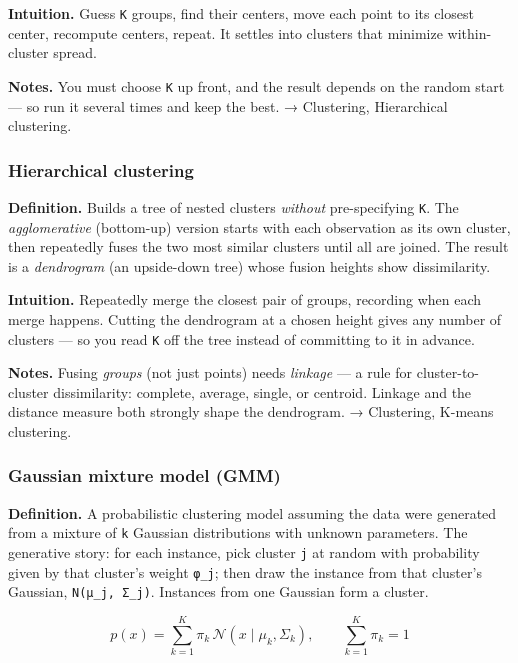 \documentclass[
  10pt,
  letterpaper,
  onecolumn]{article}
\begin{document}
\textbf{Intuition.} Guess \texttt{K} groups, find their centers, move
each point to its closest center, recompute centers, repeat. It settles
into clusters that minimize within-cluster spread.

\textbf{Notes.} You must choose \texttt{K} up front, and the result
depends on the random start --- so run it several times and keep the
best. → Clustering, Hierarchical clustering.

\hypertarget{hierarchical-clustering}{%
\subsubsection{Hierarchical clustering}\label{hierarchical-clustering}}

\textbf{Definition.} Builds a tree of nested clusters \emph{without}
pre-specifying \texttt{K}. The \emph{agglomerative} (bottom-up) version
starts with each observation as its own cluster, then repeatedly fuses
the two most similar clusters until all are joined. The result is a
\emph{dendrogram} (an upside-down tree) whose fusion heights show
dissimilarity.

\textbf{Intuition.} Repeatedly merge the closest pair of groups,
recording when each merge happens. Cutting the dendrogram at a chosen
height gives any number of clusters --- so you read \texttt{K} off the
tree instead of committing to it in advance.

\textbf{Notes.} Fusing \emph{groups} (not just points) needs
\emph{linkage} --- a rule for cluster-to-cluster dissimilarity:
complete, average, single, or centroid. Linkage and the distance measure
both strongly shape the dendrogram. → Clustering, K-means clustering.

\hypertarget{gaussian-mixture-model-gmm}{%
\subsubsection{Gaussian mixture model
(GMM)}\label{gaussian-mixture-model-gmm}}

\textbf{Definition.} A probabilistic clustering model assuming the data
were generated from a mixture of \texttt{k} Gaussian distributions with
unknown parameters. The generative story: for each instance, pick
cluster \texttt{j} at random with probability given by that cluster's
weight \texttt{φ\_j}; then draw the instance from that cluster's
Gaussian, \texttt{N(μ\_j,\ Σ\_j)}. Instances from one Gaussian form a
cluster.

\begin{equation*}
p(x)=\sum_{k=1}^{K}\pi_k\,\mathcal{N}(x\mid\mu_k,\Sigma_k),
\qquad
\sum_{k=1}^{K}\pi_k=1
\end{equation*}
\end{document}
